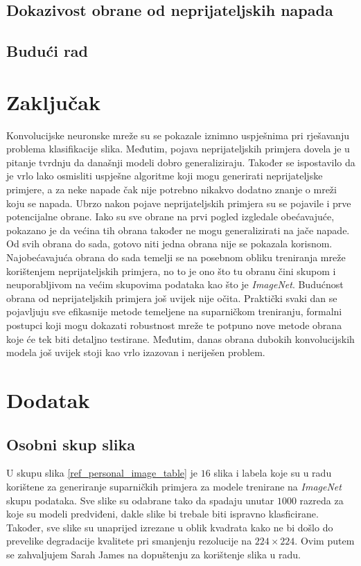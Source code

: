 \documentclass[utf8, diplomski]{fer}
\begin{document}
\section{Dokazivost obrane od neprijateljskih napada}
\section{Budući rad}

\chapter{Zaključak}
Konvolucijske neuronske mreže su se pokazale iznimno uspješnima pri rješavanju problema klasifikacije slika. Međutim, pojava neprijateljskih primjera dovela je u pitanje tvrdnju da današnji modeli dobro generaliziraju. Također se ispostavilo da je vrlo lako osmisliti uspješne algoritme koji mogu generirati neprijateljske primjere, a za neke napade čak nije potrebno nikakvo dodatno znanje o mreži koju se napada. Ubrzo nakon pojave neprijateljskih primjera su se pojavile i prve potencijalne obrane. Iako su sve obrane na prvi pogled izgledale obećavajuće, pokazano je da većina tih obrana također ne mogu generalizirati na jače napade. Od svih obrana do sada, gotovo niti jedna obrana nije se pokazala korisnom. Najobećavajuća obrana do sada temelji se na posebnom obliku treniranja mreže korištenjem neprijateljskih primjera, no to je ono što tu obranu čini skupom i neuporabljivom na većim skupovima podataka kao što je \textit{ImageNet}. Budućnost obrana od neprijateljskih primjera još uvijek nije očita. Praktički svaki dan se pojavljuju sve efikasnije metode temeljene na suparničkom treniranju, formalni postupci koji mogu dokazati robustnost mreže te potpuno nove metode obrana koje će tek biti detaljno testirane. Međutim, danas obrana dubokih konvolucijskih modela još uvijek stoji kao vrlo izazovan i neriješen problem.





\chapter{Dodatak}\label{dodatak}
\section{Osobni skup slika}\label{osobni_skup}
U skupu slika \ref{ref_personal_image_table} je $16$ slika i labela koje su u radu korištene za generiranje suparničkih primjera za modele trenirane na \textit{ImageNet} skupu podataka. Sve slike su odabrane tako da spadaju unutar $1000$ razreda za koje su modeli predviđeni, dakle slike bi trebale biti ispravno klasficirane. Također, sve slike su unaprijed izrezane u oblik kvadrata kako ne bi došlo do prevelike degradacije kvalitete pri smanjenju rezolucije na $224\times224$. Ovim putem se zahvaljujem Sarah James na dopuštenju za korištenje slika u radu.
\end{document}
